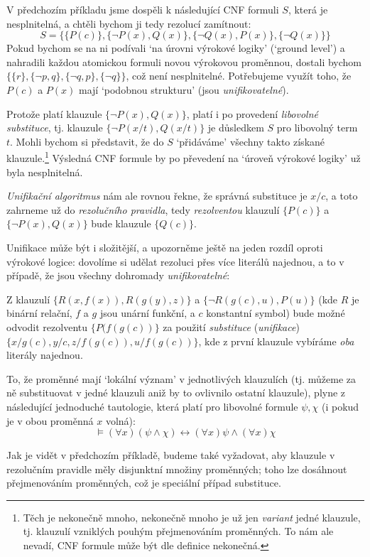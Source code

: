 \begin{example}
    V předchozím příkladu jsme dospěli k následující CNF formuli $S$, která je nesplnitelná, a chtěli bychom ji tedy rezolucí zamítnout:    
    $$
    S = \{\{P(c)\},\{\neg P(x),Q(x)\},\{\neg Q(x),P(x)\},\{\neg Q(x)\}\}
    $$
    Pokud bychom se na ni podívali `na úrovni výrokové logiky' (`ground level') a nahradili každou atomickou formuli novou výrokovou proměnnou, dostali bychom $\{\{r\},\{\neg p,q\},\{\neg q,p\},\{\neg q\}\}$, což není nesplnitelné. Potřebujeme využít toho, že $P(c)$ a $P(x)$ mají `podobnou strukturu' (jsou \emph{unifikovatelné}).

    Protože platí klauzule $\{\neg P(x),Q(x)\}$, platí i po provedení \emph{libovolné substituce}, tj. klauzule $\{\neg P(x/t),Q(x/t)\}$ je důsledkem $S$ pro libovolný term $t$. Mohli bychom si představit, že do  $S$ `přidáváme' všechny takto získané klauzule.\footnote{Těch je nekonečně mnoho, nekonečně mnoho je už jen \emph{variant} jedné klauzule, tj. klauzulí vzniklých pouhým přejmenováním proměnných. To nám ale nevadí, CNF formule může být dle definice nekonečná.} Výsledná CNF formule by po převedení na `úroveň výrokové logiky' už byla nesplnitelná. 
    
    \emph{Unifikační algoritmus} nám ale rovnou řekne, že správná substituce je $x/c$, a toto zahrneme už do \emph{rezolučního pravidla}, tedy \emph{rezolventou} klauzulí $\{P(c)\}$ a $\{\neg P(x),Q(x)\}$ bude klauzule $\{Q(c)\}$.
\end{example}

Unifikace může být i složitější, a upozorněme ještě na jeden rozdíl oproti výrokové logice: dovolíme si udělat rezoluci přes více literálů najednou, a to v případě, že jsou všechny dohromady \emph{unifikovatelné}:

\begin{example}
    Z klauzulí $\{R(x,f(x)),R(g(y),z)\}$ a $\{\neg R(g(c),u),P(u)\}$ (kde $R$ je binární relační, $f$ a $g$ jsou unární funkční, a $c$ konstantní symbol) bude možné odvodit rezolventu $\{P(f(g(c))\}$ za použití \emph{substituce} (\emph{unifikace}) $\{x/g(c),y/c,z/f(g(c)),u/f(g(c))\}$, kde z první klauzule vybíráme \emph{oba} literály najednou.
\end{example}

\begin{remark}
    To, že proměnné mají `lokální význam' v jednotlivých klauzulích (tj. můžeme za ně substituovat v jedné klauzuli aniž by to ovlivnilo ostatní klauzule), plyne z následující jednoduché tautologie, která platí pro libovolné formule $\psi,\chi$ (i pokud je v obou proměnná $x$ volná):
    $$
    \models(\forall x)(\psi \land \chi) \leftrightarrow (\forall x)\psi \land (\forall x)\chi
    $$
    
    Jak je vidět v předchozím příkladě, budeme také vyžadovat, aby klauzule v rezolučním pravidle měly disjunktní množiny proměnných; toho lze dosáhnout přejmenováním proměnných, což je speciální případ substituce.  
\end{remark}


